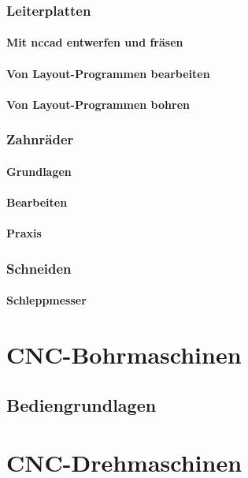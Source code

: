 \documentclass[a4paper]{book}
\begin{document}
		\subsection{Leiterplatten} 
			\subsubsection{Mit nccad entwerfen und fräsen} 
			\subsubsection{Von Layout-Programmen bearbeiten} 
			\subsubsection{Von Layout-Programmen bohren} 
		\subsection{Zahnräder} 
			\subsubsection{Grundlagen} 
			\subsubsection{Bearbeiten} 
			\subsubsection{Praxis} 			
		\subsection{Schneiden} 
			\subsubsection{Schleppmesser} 
		 
\chapter{CNC-Bohrmaschinen} 
	\section{Bediengrundlagen}

\chapter{CNC-Drehmaschinen}
\end{document}
